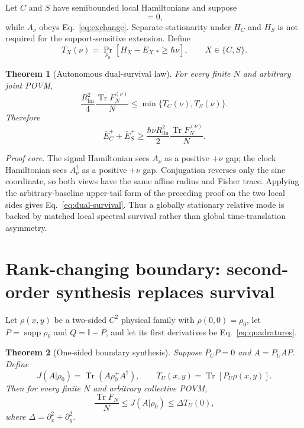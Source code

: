 \documentclass[aps,pra,preprint,nofootinbib]{revtex4-2}
\newtheorem{theorem}{Theorem}
\newcommand{\Tr}{\operatorname{Tr}}
\newcommand{\supp}{\operatorname{supp}}
\newcommand{\id}{\mathbb I}
\newcommand{\Rlin}{R_{\mathrm{lin}}}
\newcommand{\rhozero}{\rho_0}
\newcommand{\Fcl}{F}
\begin{document}
Let $C$ and $S$ have semibounded local Hamiltonians and suppose
\begin{equation}
[\rhozero,H_C+H_S]=0,
\end{equation}
while $A_\nu$ obeys Eq.~\eqref{eq:exchange}. Separate stationarity under $H_C$ and $H_S$ is not required for the support-sensitive extension. Define
\begin{equation}
T_X(\nu)=\Pr_{\rhozero}[H_X-E_{X,*}\ge\hbar\nu],\qquad X\in\{C,S\}.
\end{equation}

\begin{theorem}[Autonomous dual-survival law]
\label{thm:dual-survival}
For every finite $N$ and arbitrary joint POVM,
\begin{equation}
\boxed{
\frac{\Rlin^2}{4}\frac{\Tr \Fcl_N^{(\nu)}}{N}
\le \min\{T_C(\nu),T_S(\nu)\}.
}
\label{eq:dual-survival}
\end{equation}
Therefore
\begin{equation}
\bar E_C^+ +\bar E_S^+
\ge
\frac{\hbar\nu\Rlin^2}{2}
\frac{\Tr \Fcl_N^{(\nu)}}{N}.
\label{eq:dual-energy}
\end{equation}
\end{theorem}

\emph{Proof core.} The signal Hamiltonian sees $A_\nu$ as a positive $+\nu$ gap; the clock Hamiltonian sees $A_\nu^\dagger$ as a positive $+\nu$ gap. Conjugation reverses only the sine coordinate, so both views have the same affine radius and Fisher trace. Applying the arbitrary-baseline upper-tail form of the preceding proof on the two local sides gives Eq.~\eqref{eq:dual-survival}. Thus a globally stationary relative mode is backed by matched local spectral survival rather than global time-translation asymmetry.

\section{Rank-changing boundary: second-order synthesis replaces survival}
\label{sec:boundary}

Let $\rho(x,y)$ be a two-sided $C^2$ physical family with $\rho(0,0)=\rhozero$, let $P=\supp\rhozero$ and $Q=\id-P$, and let its first derivatives be Eq.~\eqref{eq:quadratures}.

\begin{theorem}[One-sided boundary synthesis]
\label{thm:one-sided-boundary}
Suppose $P_U P=0$ and $A=P_UAP$. Define
\begin{equation}
J(A|\rhozero)=\Tr(A\rhozero^+A^\dagger),
\qquad
T_U(x,y)=\Tr[P_U\rho(x,y)].
\end{equation}
Then for every finite $N$ and arbitrary collective POVM,
\begin{equation}
\boxed{
\frac{\Tr \Fcl_N}{N}
\le J(A|\rhozero)
\le \Delta T_U(0),
}
\label{eq:one-sided-boundary}
\end{equation}
where $\Delta=\partial_x^2+\partial_y^2$.
\end{theorem}
\end{document}

